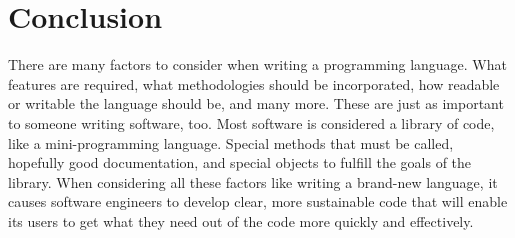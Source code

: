 \documentclass[11pt]{article}
\begin{document}
\section{Conclusion}
There are many factors to consider when writing a programming language. What features are required, what methodologies should be incorporated, how readable or writable the language should be, and many more. These are just as important to someone writing software, too. Most software is considered a library of code, like a mini-programming language. Special methods that must be called, hopefully good documentation, and special objects to fulfill the goals of the library. When considering all these factors like writing a brand-new language, it causes software engineers to develop clear, more sustainable code that will enable its users to get what they need out of the code more quickly and effectively.

\raggedright


\end{document}
